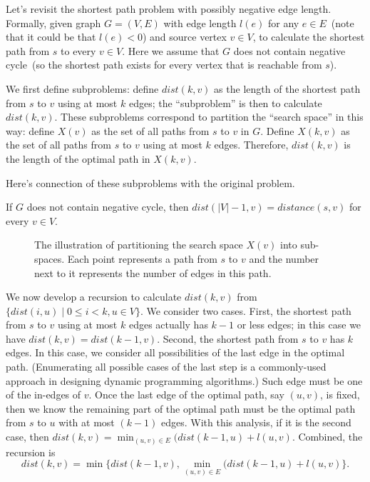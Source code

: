 Let's revisit the shortest path problem with possibly negative edge length.
Formally, given graph $G = (V, E)$ with edge length $l(e)$ for any $e\in E$~(note
that it could be that $l(e) < 0$) and source vertex $v\in V$,
to calculate the shortest path from $s$ to every $v\in V$.
Here we assume that $G$ does not contain negative cycle~(so
the shortest path exists for every vertex that is reachable from $s$).

We first define subproblems: define $dist(k,v)$ as the length
of the shortest path from $s$ to $v$ using at most $k$ edges;
the ``subproblem'' is then to calculate $dist(k,v)$.
These subproblems correspond to partition the ``search space''
in this way: define $X(v)$ as the set of all paths from $s$ to $v$ in $G$.
Define $X(k, v)$ as the set of all paths from $s$ to $v$ using
at most $k$ edges. Therefore, $dist(k,v)$ is the length
of the optimal path in $X(k,v)$.

Here's connection of these subproblems with the original problem.
\begin{fact}
If $G$ does not contain negative cycle, then $dist(|V| - 1, v) = distance(s, v)$ for every $v\in V$.
\end{fact}

\begin{figure}[h]
\centering{}
\caption{The illustration of partitioning the search space $X(v)$ into sub-spaces.
Each point represents a path from $s$ to $v$ and the number next to it represents the
number of edges in this path.}
\end{figure}

We now develop a recursion to calculate $dist(k,v)$ from $\{dist(i, u) \mid 0 \le i < k, u\in V\}$.
We consider two cases. First, the shortest path from $s$ to $v$ using at most $k$ edges actually has $k - 1$ or less edges;
in this case we have $dist(k, v) = dist(k - 1, v)$.
Second, the shortest path from $s$ to $v$ has $k$ edges. In this case,
we consider all possibilities of the last edge in the optimal path. (Enumerating
all possible cases of the last step is a commonly-used approach in designing dynamic programming algorithms.)
Such edge must be one of the in-edges of $v$. Once the last edge of the optimal path, say $(u,v)$, is fixed,
then we know the remaining part of the optimal path must be the optimal path from $s$ to $u$ with at most $(k - 1)$ edges.
With this analysis, if it is the second case, then $dist(k,v) = \min_{(u,v)\in E} (dist(k-1, u)  + l(u,v)$.
Combined, the recursion is
$$\textstyle dist(k,v) = \min\{dist(k-1, v), \min_{(u,v)\in E} (dist(k-1,u) + l(u,v)\}.$$

